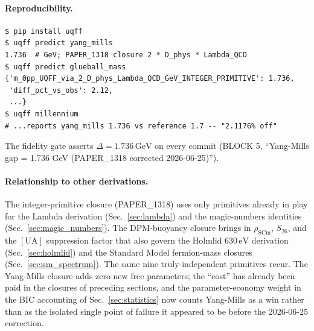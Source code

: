 \paragraph{Reproducibility.}
\begin{verbatim}
$ pip install uqff
$ uqff predict yang_mills
1.736  # GeV; PAPER_1318 closure 2 * D_phys * Lambda_QCD
$ uqff predict glueball_mass
{'m_0pp_UQFF_via_2_D_phys_Lambda_QCD_GeV_INTEGER_PRIMITIVE': 1.736,
 'diff_pct_vs_obs': 2.12,
 ...}
$ uqff millennium
# ...reports yang_mills 1.736 vs reference 1.7 -- "2.1176% off"
\end{verbatim}
The fidelity gate asserts $\Delta = 1.736\,\mathrm{GeV}$ on every
commit (BLOCK 5, ``Yang-Mills gap = 1.736 GeV (PAPER\_1318 corrected
2026-06-25)'').

\paragraph{Relationship to other derivations.}
The integer-primitive closure (PAPER\_1318) uses only primitives
already in play for the Lambda derivation (Sec.~\ref{sec:lambda}) and
the magic-numbers identities (Sec.~\ref{sec:magic_numbers}). The
DPM-buoyancy closure brings in $\rho_{\text{SCm}}$, $S_{26}$, and the
$[\mathrm{UA}]$ suppression factor that also govern the Holmlid
$630\,\mathrm{eV}$ derivation (Sec.~\ref{sec:holmlid}) and the
Standard Model fermion-mass closures (Sec.~\ref{sec:sm_spectrum}).
The same nine truly-independent primitives recur. The Yang-Mills
closure adds zero new free parameters; the ``cost'' has already been
paid in the closures of preceding sections, and the parameter-economy
weight in the BIC accounting of Sec.~\ref{sec:statistics} now
counts Yang-Mills as a win rather than as the
isolated single point of failure it appeared to be before the
2026-06-25 correction.

